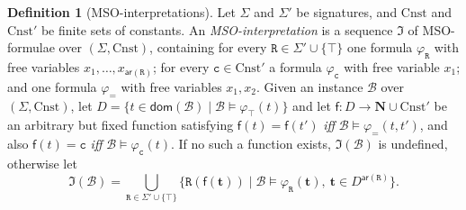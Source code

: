 \documentclass[10pt,a4paper]{amsart}
\theoremstyle{definition}
\numberwithin{equation}{section}
\theoremstyle{plain}
\theoremstyle{definition}
\newtheorem{definition}[definition]{Definition}
\theoremstyle{myexample}
\theoremstyle{plain}
\theoremstyle{definition}
\renewcommand{\vec}[1]{\boldsymbol{#1}}
\newcommand{\adom}[1]{\fcn{dom}(#1)}
\newcommand{\arity}[1]{\fcn{ar}(#1)}
\newcommand{\fcn}[1]{\mathsf{#1}}
\newcommand{\pred}[1]{\mathtt{#1}}
\newcommand{\const}[1]{\mathtt{#1}}
\newcommand{\vt}{\vec{t}}
\newcommand{\rpred}{\pred{R}}
\newcommand{\iffi}{\textit{iff} } %
\renewcommand{\phi}{\varphi}
\begin{document}
\begin{definition}[MSO-interpretations]
Let $\Sigma$ and $\Sigma'$ be signatures, and $\mathrm{Cnst}$ and $\mathrm{Cnst}'$ be finite sets of constants. An {\em MSO-interpretation} is a sequence $\mathfrak{I}$ 
of MSO-formulae over $(\Sigma, \mathrm{Cnst})$, containing for every $\rpred \in \Sigma' \cup \{\top\}$ one formula $\phi_\rpred$ with free variables $x_1,\ldots,x_{\arity{\rpred}}$; for every $\const{c} \in \mathrm{Cnst}'$ a formula $\phi_\const{c}$ with free variable $x_1$; and one formula $\phi_=$ with free variables $x_1,x_2$.   
Given an instance $\mathcal{B}$ over $(\Sigma, \mathrm{Cnst})$, let 
$D = \{t \in \adom{\mathcal{B}} \mid \mathcal{B} \models \varphi_\top(t)\}$ and let 
$\fcn{f}: D \to \mathbf{N}\cup \mathrm{Cnst}'$ be an arbitrary but fixed function satisfying 
$\fcn{f}(t)=\fcn{f}(t')$ \iffi $\mathcal{B}\models \varphi_=(t,t')$,
and also $\fcn{f}(t)=\const{c}$ \iffi $\mathcal{B}\models \varphi_\const{c}(t)$.
If no such a function exists, $\mathfrak{I}(\mathcal{B})$ is undefined, otherwise let
$$
\mathfrak{I}(\mathcal{B})=\textstyle\bigcup_{\rpred \in \Sigma' \cup \{\top\}}\{\rpred(\fcn{f}(\vt)) \mid \mathcal{B} \models {\varphi}_{\rpred}(\vt),\ \vt \in D^{\arity{\rpred}} \}.
$$


\end{definition}
\end{document}
